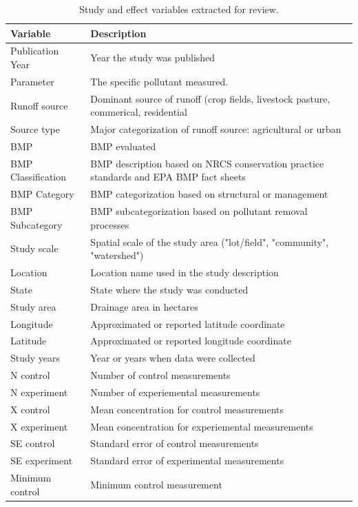 \documentclass[utf8]{FrontiersinHarvard}
\begin{document}
\begin{table}

\caption{\label{tab:datvars}Study and effect variables extracted for review.}
\centering
\begin{tabular}[t]{>{\raggedright\arraybackslash}p{10em}>{\raggedright\arraybackslash}p{25em}}
\toprule
Variable & Description\\
\midrule
Publication Year & Year the study was published\\
Parameter & The specific pollutant measured.\\
Runoff source & Dominant source of runoff (crop fields, livestock pasture, commerical, residential\\
Source type & Major categorization of runoff source: agricultural or urban\\
BMP & BMP evaluated\\
\addlinespace
BMP Classification & BMP description based on NRCS conservation practice standards and EPA BMP fact sheets\\
BMP Category & BMP categorization based on structural or management\\
BMP Subcategory & BMP subcategorization based on pollutant removal processes\\
Study scale & Spatial scale of the study area ("lot/field", "community", "watershed")\\
Location & Location name used in the study description\\
\addlinespace
State & State where the study was conducted\\
Study area & Drainage area in hectares\\
Longitude & Approximated or reported latitude coordinate\\
Latitude & Approximated or reported longitude coordinate\\
Study years & Year or years when data were collected\\
\addlinespace
N control & Number of control measurements\\
N experiment & Number of experiemental measurements\\
X control & Mean concentration for control measurements\\
X experiment & Mean concentration for experiemental measurements\\
SE control & Standard error of control measurements\\
\addlinespace
SE experiment & Standard error of experimental measurements\\
Minimum control & Minimum control measurement\\

\end{tabular}
\end{table}
\end{document}
